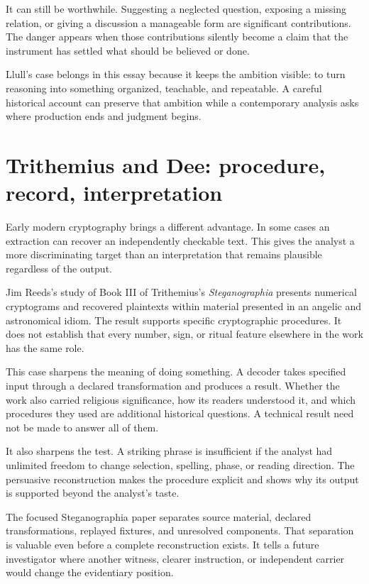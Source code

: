\documentclass[11pt]{article}
\begin{document}
It can still be worthwhile. Suggesting a neglected question, exposing a
missing relation, or giving a discussion a manageable form are significant
contributions. The danger appears when those contributions silently become
a claim that the instrument has settled what should be believed or done.

Llull's case belongs in this essay because it keeps the ambition visible:
to turn reasoning into something organized, teachable, and repeatable.
A careful historical account can preserve that ambition while a contemporary
analysis asks where production ends and judgment begins.


\section{Trithemius and Dee: procedure, record, interpretation}

Early modern cryptography brings a different advantage. In some cases an
extraction can recover an independently checkable text. This gives the
analyst a more discriminating target than an interpretation that remains
plausible regardless of the output.

Jim Reeds's study of Book III of Trithemius's \emph{Steganographia} presents
numerical cryptograms and recovered plaintexts within material presented
in an angelic and astronomical idiom.\cite{reeds}
The result supports specific cryptographic procedures. It does not establish
that every number, sign, or ritual feature elsewhere in the work has the
same role.

This case sharpens the meaning of doing something. A decoder takes
specified input through a declared transformation and produces a result.
Whether the work also carried religious significance, how its readers
understood it, and which procedures they used are additional historical
questions. A technical result need not be made to answer all of them.

It also sharpens the test. A striking phrase is insufficient if the analyst
had unlimited freedom to change selection, spelling, phase, or reading direction.
The persuasive reconstruction makes the procedure explicit and shows why its
output is supported beyond the analyst's taste.

The focused Steganographia paper separates source material, declared
transformations, replayed fixtures, and unresolved components.\cite{trithemiusPaper}
That separation is valuable even before a complete reconstruction exists.
It tells a future investigator where another witness, clearer instruction,
or independent carrier would change the evidentiary position.
\end{document}
